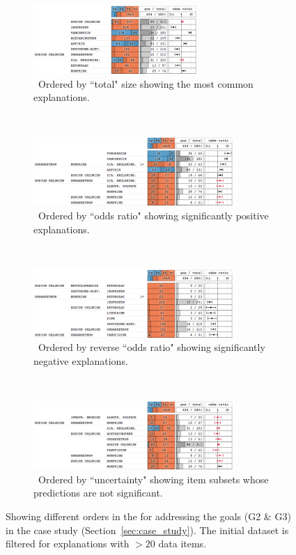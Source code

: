 \begin{figure}
\centering
\begin{subfigure}[b]{\linewidth}
    \hfill
    \includegraphics[height=7em]{explainer/expl_10_size}
    \caption{~Ordered by ``total" size showing the most common explanations.}
    \label{figs:expl_10_size}
\end{subfigure}
\\
\begin{subfigure}[b]{\linewidth}
    \hfill
    \includegraphics[height=7em]{explainer/expl_10_or_pos}
    \caption{~Ordered by ``odds ratio" showing significantly positive explanations.}
    \label{figs:expl_10_or_pos}
\end{subfigure}%
\\
\begin{subfigure}[b]{\linewidth}
    \hfill
    \includegraphics[height=7em]{explainer/expl_10_or_neg}
    \caption{~Ordered by reverse ``odds ratio" showing significantly negative explanations.}
    \label{figs:expl_10_or_neg}
\end{subfigure}%
\\
\begin{subfigure}[b]{\linewidth}
    \hfill
    \includegraphics[height=7em]{explainer/expl_new_uncertain}
    \caption{~Ordered by ``uncertainty" showing item subsets whose predictions are not significant.}
    \label{figs:expl_10_uncertain}
\end{subfigure}
\caption{
Showing different orders in the \textbf{\tabB} for addressing the goals (G2 \& G3) in the case study (Section~\ref{sec:case_study}). The initial dataset is filtered for explanations with $> 20$ data items.
}
\end{figure}